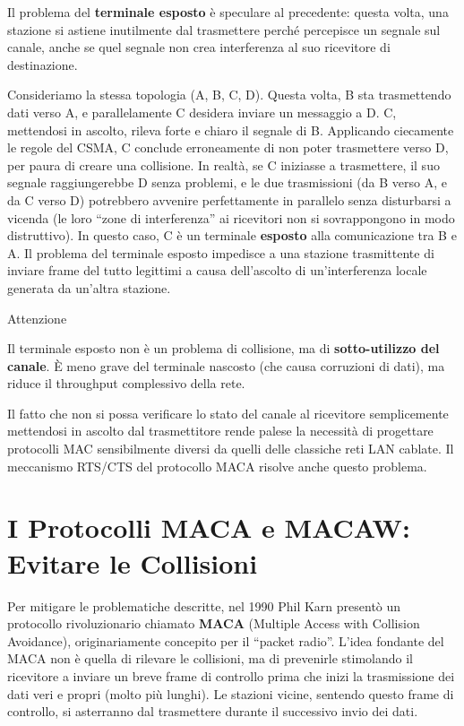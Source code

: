 \documentclass[
  italian,
  openany]{book}
\begin{document}
Il problema del \textbf{terminale esposto} è speculare al precedente:
questa volta, una stazione si astiene inutilmente dal trasmettere perché
percepisce un segnale sul canale, anche se quel segnale non crea
interferenza al suo ricevitore di destinazione.

Consideriamo la stessa topologia (A, B, C, D). Questa volta, B sta
trasmettendo dati verso A, e parallelamente C desidera inviare un
messaggio a D. C, mettendosi in ascolto, rileva forte e chiaro il
segnale di B. Applicando ciecamente le regole del CSMA, C conclude
erroneamente di non poter trasmettere verso D, per paura di creare una
collisione. In realtà, se C iniziasse a trasmettere, il suo segnale
raggiungerebbe D senza problemi, e le due trasmissioni (da B verso A, e
da C verso D) potrebbero avvenire perfettamente in parallelo senza
disturbarsi a vicenda (le loro ``zone di interferenza'' ai ricevitori
non si sovrappongono in modo distruttivo). In questo caso, C è un
terminale \textbf{esposto} alla comunicazione tra B e A. Il problema del
terminale esposto impedisce a una stazione trasmittente di inviare frame
del tutto legittimi a causa dell'ascolto di un'interferenza locale
generata da un'altra stazione.

\begin{calloutwarning}{Attenzione}

Il terminale esposto non è un problema di collisione, ma di
\textbf{sotto-utilizzo del canale}. È meno grave del terminale nascosto
(che causa corruzioni di dati), ma riduce il throughput complessivo
della rete.

\end{calloutwarning}

Il fatto che non si possa verificare lo stato del canale al ricevitore
semplicemente mettendosi in ascolto dal trasmettitore rende palese la
necessità di progettare protocolli MAC sensibilmente diversi da quelli
delle classiche reti LAN cablate. Il meccanismo RTS/CTS del protocollo
MACA risolve anche questo problema.

\section{I Protocolli MACA e MACAW: Evitare le
Collisioni}\label{i-protocolli-maca-e-macaw-evitare-le-collisioni}

Per mitigare le problematiche descritte, nel 1990 Phil Karn presentò un
protocollo rivoluzionario chiamato \textbf{MACA} (Multiple Access with
Collision Avoidance), originariamente concepito per il ``packet radio''.
L'idea fondante del MACA non è quella di rilevare le collisioni, ma di
prevenirle stimolando il ricevitore a inviare un breve frame di
controllo prima che inizi la trasmissione dei dati veri e propri (molto
più lunghi). Le stazioni vicine, sentendo questo frame di controllo, si
asterranno dal trasmettere durante il successivo invio dei dati.
\end{document}
